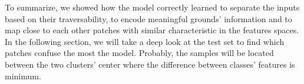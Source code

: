 \documentclass[../document.tex]{subfiles}
\begin{document}
To summarize, we showed how the model correctly learned to separate the inputs based on their traversability, to encode meaningful grounds' information and to map close to each other patches with similar characteristic in the features spaces. In the following section, we will take a deep look at the test set to find which patches confuse the most the model. Probably, the samples will be located between the two clusters' center where the difference between classes' features is minimum. 



\end{document}
